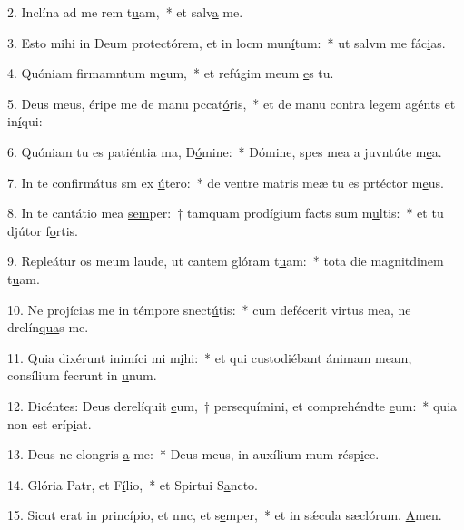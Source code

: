2. Inclína ad me rem t\uline{u}am,~* et salv\uline{a} me.\par 
3. Esto mihi in Deum protectórem, et in locm mun\uline{í}tum:~* ut salvm me fác\uline{i}as.\par 
4. Quóniam firmamntum m\uline{e}um,~* et refúgim meum \uline{e}s tu.\par 
5. Deus meus, éripe me de manu pccat\uline{ó}ris,~* et de manu contra legem agénts et in\uline{í}qui:\par 
6. Quóniam tu es patiéntia ma, D\uline{ó}mine:~* Dómine, spes mea a juvntúte m\uline{e}a.\par 
7. In te confirmátus sm ex \uline{ú}tero:~* de ventre matris meæ tu es prtéctor m\uline{e}us.\par 
8. In te cantátio mea \uline{sem}per:~† tamquam prodígium facts sum m\uline{u}ltis:~* et tu djútor f\uline{o}rtis.\par 
9. Repleátur os meum laude, ut cantem glóram t\uline{u}am:~* tota die magnitdinem t\uline{u}am.\par 
10. Ne projícias me in témpore snect\uline{ú}tis:~* cum defécerit virtus mea, ne drelín\uline{qua}s me.\par 
11. Quia dixérunt inimíci mi m\uline{i}hi:~* et qui custodiébant ánimam meam, consílium fecrunt in \uline{u}num.\par 
12. Dicéntes: Deus derelíquit \uline{e}um,~† persequímini, et comprehéndte \uline{e}um:~* quia non est  eríp\uline{i}at.\par 
13. Deus ne elongris \uline{a} me:~* Deus meus, in auxílium mum résp\uline{i}ce.\par 
14. Glória Patr, et F\uline{í}lio,~* et Spirtui S\uline{a}ncto.\par 
15. Sicut erat in princípio, et nnc, et s\uline{e}mper,~* et in sǽcula sæclórum. \uline{A}men.\par 

